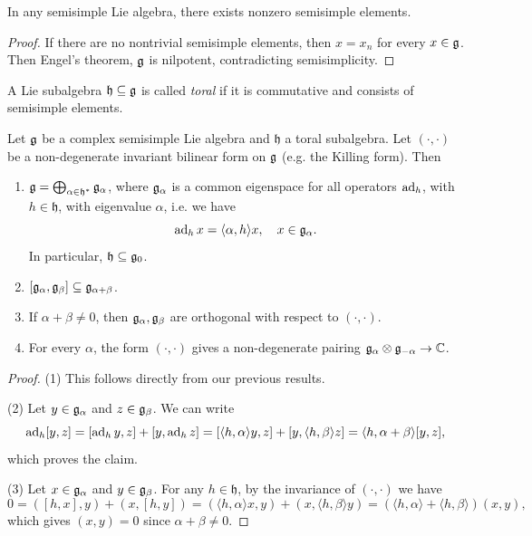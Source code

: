 \begin{corollary}
  In any semisimple Lie algebra, there
  exists nonzero semisimple elements.
\end{corollary}

\begin{proof}
  If there are no nontrivial semisimple
  elements, then $x = x_n$ for every
  $x \in \mathfrak{g}$. Then Engel's theorem,
  $\mathfrak{g}$ is nilpotent, contradicting
  semisimplicity.
\end{proof}

\begin{definition}
  A Lie subalgebra
  $\mathfrak{h} \subseteq \mathfrak{g}$ is called
  \emph{toral} if it is commutative and
  consists of semisimple elements.
\end{definition}

\begin{theorem}
  Let $\mathfrak{g}$ be a complex semisimple Lie
  algebra and $\mathfrak{h}$ a toral
  subalgebra. Let $(\cdot, \cdot)$ be a
  non-degenerate invariant bilinear
  form on $\mathfrak{g}$ (e.g. the Killing form).
  Then
  \begin{enumerate}
    \item $\mathfrak{g} = \bigoplus_{\alpha \in \mathfrak{h}^*} \mathfrak{g}_\alpha$,
      where $\mathfrak{g}_\alpha$ is a common
      eigenspace for all operators
      $\operatorname{ad}_h$, with $h \in \mathfrak{h}$,
      with eigenvalue $\alpha$, i.e.
      we have
      \[
        \operatorname{ad}_h x = \langle \alpha, h \rangle x, \quad x \in \mathfrak{g}_\alpha.
      \]
      In particular, $\mathfrak{h} \subseteq \mathfrak{g}_0$.
    \item $[\mathfrak{g}_\alpha, \mathfrak{g}_\beta] \subseteq \mathfrak{g}_{\alpha + \beta}$.
    \item If $\alpha + \beta \ne 0$, then
      $\mathfrak{g}_\alpha, \mathfrak{g}_\beta$ are orthogonal
      with respect to $(\cdot, \cdot)$.
    \item For every $\alpha$, the
      form $(\cdot, \cdot)$ gives a
      non-degenerate pairing
      $\mathfrak{g}_{\alpha} \otimes \mathfrak{g}_{-\alpha} \to \mathbb{C}$.
  \end{enumerate}
\end{theorem}

\begin{proof}
  (1) This follows directly from our
  previous results.

  (2) Let $y \in \mathfrak{g}_\alpha$ and
  $z \in \mathfrak{g}_\beta$. We can write
  \[
    \operatorname{ad}_h [y, z]
    = [\operatorname{ad}_h y, z] + [y, \operatorname{ad}_h z]
    = [\langle h, \alpha \rangle y, z]
    + [y, \langle h, \beta \rangle z]
    = \langle h, \alpha + \beta \rangle [y, z],
  \]
  which proves the claim.

  (3) Let $x \in \mathfrak{g}_\alpha$
  and $y \in \mathfrak{g}_\beta$.
  For any $h \in \mathfrak{h}$,
  by the
  invariance of $(\cdot, \cdot)$ we have
  \[
    0 = ([h, x], y) + (x, [h, y])
    = (\langle h, \alpha \rangle x, y)
    + (x, \langle h, \beta \rangle y)
    = (\langle h, \alpha \rangle + \langle h, \beta \rangle)
    (x, y),
  \]
  which gives $(x, y) = 0$ since
  $\alpha + \beta \ne 0$.
\end{proof}

